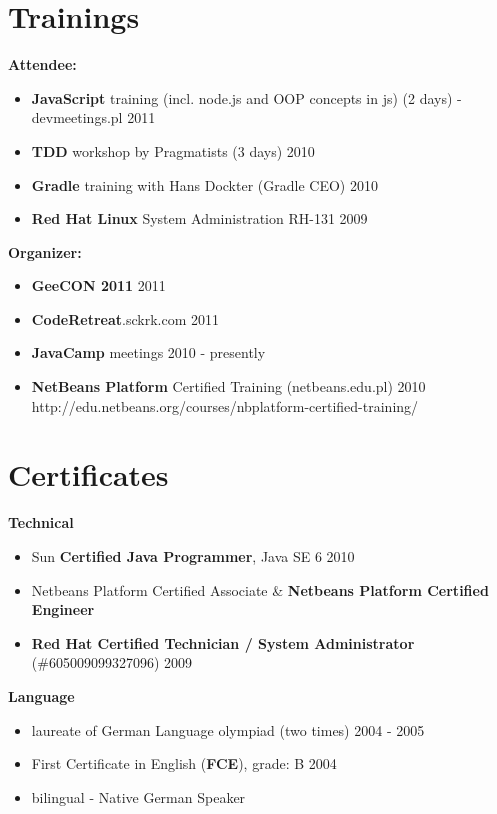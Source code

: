 \documentclass{res}
\begin{document}
\begin{resume}
\section{Trainings} 
{\bf Attendee:}
\begin{itemize}
 \item \textbf{JavaScript} training (incl. node.js and OOP concepts in js) (2 days) - devmeetings.pl \hfill 2011
 \item \textbf{TDD} workshop by Pragmatists (3 days) \hfill 2010
 \item \textbf{Gradle} training with Hans Dockter (Gradle CEO) \hfill 2010
 \item \textbf{Red Hat Linux} System Administration RH-131 \hfill 2009
\end{itemize}
{\bf Organizer:}
\begin{itemize}
 \item \textbf{GeeCON 2011} \hfill 2011
 \item \textbf{CodeRetreat}.sckrk.com \hfill 2011
 \item \textbf{JavaCamp} meetings \hfill 2010 - presently
 \item \textbf{NetBeans Platform} Certified Training (netbeans.edu.pl) \hfill 2010 \\
	http://edu.netbeans.org/courses/nbplatform-certified-training/ 
\end{itemize}

\section{Certificates} 
{\bf Technical}
\begin{itemize}
 \item Sun \textbf{Certified Java Programmer}, Java SE 6 \hfill 2010
 \item Netbeans Platform Certified Associate \& \textbf{Netbeans Platform Certified Engineer}
 \item \textbf{ Red Hat Certified Technician / System
Administrator} (\#605009099327096) \hfill 2009\\
\end{itemize}
{\bf Language}
\begin{itemize}
 \item laureate of German Language olympiad (two times) \hfill 2004 - 2005
 \item First Certificate in English (\textbf{FCE}), grade: B \hfill 2004
 \item bilingual - Native German Speaker
\end{itemize}


\end{resume}
\end{document}
